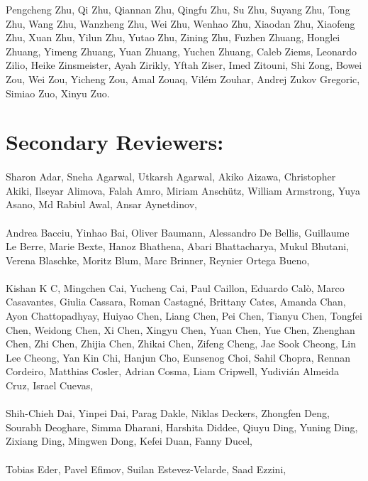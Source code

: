 Pengcheng Zhu, Qi Zhu, Qiannan Zhu, Qingfu Zhu, Su Zhu, Suyang Zhu, Tong Zhu, Wang Zhu, Wanzheng Zhu, Wei Zhu, Wenhao Zhu, Xiaodan Zhu, Xiaofeng Zhu, Xuan Zhu, Yilun Zhu, Yutao Zhu, Zining Zhu, Fuzhen Zhuang, Honglei Zhuang, Yimeng Zhuang, Yuan Zhuang, Yuchen Zhuang, Caleb Ziems, Leonardo Zilio, Heike Zinsmeister, Ayah Zirikly, Yftah Ziser, Imed Zitouni, Shi Zong, Bowei Zou, Wei Zou, Yicheng Zou, Amal Zouaq, Vilém Zouhar, Andrej Zukov Gregoric, Simiao Zuo, Xinyu Zuo.

\section*{Secondary Reviewers:}

\paragraph{}Sharon Adar, Sneha Agarwal, Utkarsh Agarwal, Akiko Aizawa, Christopher Akiki, Ilseyar Alimova, Falah Amro, Miriam Anschütz, William Armstrong, Yuya Asano, Md Rabiul Awal, Ansar Aynetdinov,
\paragraph{}Andrea Bacciu, Yinhao Bai, Oliver Baumann, Alessandro De Bellis, Guillaume Le Berre, Marie Bexte, Hanoz Bhathena, Abari Bhattacharya, Mukul Bhutani, Verena Blaschke, Moritz Blum, Marc Brinner, Reynier Ortega Bueno,
\paragraph{}Kishan K C, Mingchen Cai, Yucheng Cai, Paul Caillon, Eduardo Calò, Marco Casavantes, Giulia Cassara, Roman Castagné, Brittany Cates, Amanda Chan, Ayon Chattopadhyay, Huiyao Chen, Liang Chen, Pei Chen, Tianyu Chen, Tongfei Chen, Weidong Chen, Xi Chen, Xingyu Chen, Yuan Chen, Yue Chen, Zhenghan Chen, Zhi Chen, Zhijia Chen, Zhikai Chen, Zifeng Cheng, Jae Sook Cheong, Lin Lee Cheong, Yan Kin Chi, Hanjun Cho, Eunsenog Choi, Sahil Chopra, Rennan Cordeiro, Matthias Cosler, Adrian Cosma, Liam Cripwell, Yudivián Almeida Cruz, Israel Cuevas,
\paragraph{}Shih-Chieh Dai, Yinpei Dai, Parag Dakle, Niklas Deckers, Zhongfen Deng, Sourabh Deoghare, Simma Dharani, Harshita Diddee, Qiuyu Ding, Yuning Ding, Zixiang Ding, Mingwen Dong, Kefei Duan, Fanny Ducel,
\paragraph{}Tobias Eder, Pavel Efimov, Suilan Estevez-Velarde, Saad Ezzini,
